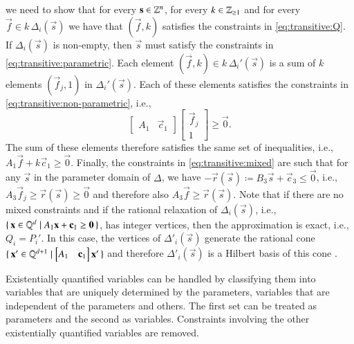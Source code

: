 we need to show that for every $\vec s \in \Z^n$, for every
$k \in \mathbb{Z}_{\ge 1}$ and for every $\vec f \in k \, \Delta_i(\vec s)$
we have that
$(\vec f, k)$ satisfies the constraints in \eqref{eq:transitive:Q}.
If $\Delta_i(\vec s)$ is non-empty, then $\vec s$ must satisfy
the constraints in \eqref{eq:transitive:parametric}.
Each element $(\vec f, k) \in k \, \Delta_i'(\vec s)$ is a sum
of $k$ elements $(\vec f_j, 1)$ in $\Delta_i'(\vec s)$.
Each of these elements satisfies the constraints in
\eqref{eq:transitive:non-parametric}, i.e.,
$$
\left[
\begin{matrix}
A_1 & \vec c_1
\end{matrix}
\right]
\left[
\begin{matrix}
\vec f_j \\ 1
\end{matrix}
\right]
\ge \vec 0
.
$$
The sum of these elements therefore satisfies the same set of inequalities,
i.e., $A_1 \vec f + k \vec c_1 \geq \vec 0$.
Finally, the constraints in \eqref{eq:transitive:mixed} are such
that for any $\vec s$ in the parameter domain of $\Delta$,
we have $-\vec r(\vec s) \coloneqq B_3 \vec s + \vec c_3 \le \vec 0$,
i.e., $A_3 \vec f_j \ge \vec r(\vec s) \ge \vec 0$
and therefore also $A_3 \vec f \ge \vec r(\vec s)$.
Note that if there are no mixed constraints and if the
rational relaxation of $\Delta_i(\vec s)$, i.e.,
$\{\, \vec x \in \Q^d \mid A_1 \vec x + \vec c_1 \ge \vec 0\,\}$,
has integer vertices, then the approximation is exact, i.e.,
$Q_i = P_i'$.  In this case, the vertices of $\Delta'_i(\vec s)$
generate the rational cone
$\{\, \vec x' \in \Q^{d+1} \mid \left[
\begin{matrix}
A_1 & \vec c_1
\end{matrix}
\right] \vec x' \,\}$ and therefore $\Delta'_i(\vec s)$ is
a Hilbert basis of this cone .

Existentially quantified variables can be handled by
classifying them into variables that are uniquely
determined by the parameters, variables that are independent
of the parameters and others.  The first set can be treated
as parameters and the second as variables.  Constraints involving
the other existentially quantified variables are removed.

